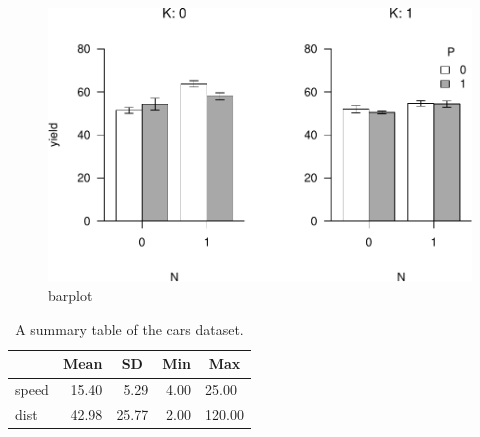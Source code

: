 \documentclass[
  english,
  man,draftall]{apa6}
\begin{document}
\begin{figure}
\centering
\includegraphics{paper_files/figure-latex/unnamed-chunk-5-1.pdf}
\caption{\label{fig:unnamed-chunk-5}barplot}
\end{figure}

\begin{table}[tbp]

\begin{center}
\begin{threeparttable}

\caption{\label{tab:unnamed-chunk-6}A summary table of the cars dataset.}

\begin{tabular}{lrrrl}
\toprule
 & \multicolumn{1}{c}{Mean} & \multicolumn{1}{c}{SD} & \multicolumn{1}{c}{Min} & \multicolumn{1}{c}{Max}\\
\midrule
speed & 15.40 & 5.29 & 4.00 & 25.00\\
dist & 42.98 & 25.77 & 2.00 & 120.00\\
\bottomrule
\end{tabular}

\end{threeparttable}
\end{center}

\end{table}
\end{document}
